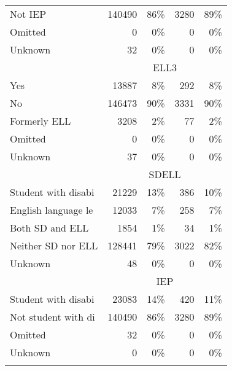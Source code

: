 \begin{longtable}{lrr@{\extracolsep{10pt}}rr}
  Not IEP & 140490 & 86\% & 3280 & 89\% \\ 
  Omitted &   0 & 0\% &   0 & 0\% \\ 
  Unknown &  32 & 0\% &   0 & 0\% \\ 
   \pagebreak[2] \hline & \multicolumn{4}{c}{ELL3} \\ \cline{2-5} Yes & 13887 & 8\% & 292 & 8\% \\ 
  No & 146473 & 90\% & 3331 & 90\% \\ 
  Formerly ELL & 3208 & 2\% &  77 & 2\% \\ 
  Omitted &   0 & 0\% &   0 & 0\% \\ 
  Unknown &  37 & 0\% &   0 & 0\% \\ 
   \pagebreak[2] \hline & \multicolumn{4}{c}{SDELL} \\ \cline{2-5} Student with disabi & 21229 & 13\% & 386 & 10\% \\ 
  English language le & 12033 & 7\% & 258 & 7\% \\ 
  Both SD and ELL & 1854 & 1\% &  34 & 1\% \\ 
  Neither SD nor ELL & 128441 & 79\% & 3022 & 82\% \\ 
  Unknown &  48 & 0\% &   0 & 0\% \\ 
   \pagebreak[2] \hline & \multicolumn{4}{c}{IEP} \\ \cline{2-5} Student with disabi & 23083 & 14\% & 420 & 11\% \\ 
  Not student with di & 140490 & 86\% & 3280 & 89\% \\ 
  Omitted &  32 & 0\% &   0 & 0\% \\ 
  Unknown &   0 & 0\% &   0 & 0\% \\ 
  \hline
\label{g4mathdesc}
\end{longtable}
